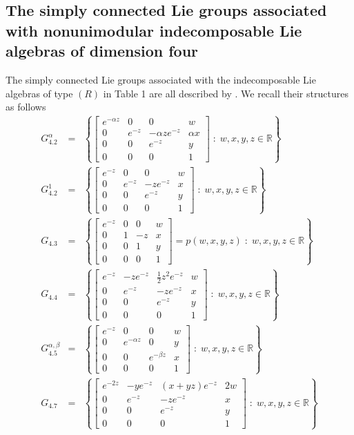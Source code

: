 \documentclass[12pt,a4paper,twoside]{article}
\theoremstyle{definition}
\begin{document}
\subsection{The simply connected Lie groups associated with nonunimodular indecomposable Lie algebras of dimension four}
The simply connected Lie groups associated with the indecomposable Lie algebras of type $(R)$ in Table 1 are all described by \cite{biggs2016classification}. We recall their structures as follows
\begin{eqnarray*}
G_{4.2}^{\alpha} &=& \left\lbrace \begin{bmatrix}
e^{-\alpha z} & 0 & 0 & w\\
0 & e^{-z} & -\alpha ze^{-z} & \alpha x\\
0 & 0 & e^{-z} & y\\
0 & 0 & 0 & 1
\end{bmatrix} \;:\; w, x, y, z \in \mathbb{R}\right\rbrace\\
G_{4.2}^{1} &=& \left\lbrace \begin{bmatrix}
e^{-z} & 0 & 0 & w\\
0 & e^{-z} & -ze^{-z} & x\\
0 & 0 & e^{-z} & y\\
0 & 0 & 0 & 1
\end{bmatrix} \;:\; w, x, y, z \in \mathbb{R}\right\rbrace\\
G_{4.3} &=& \left\lbrace \begin{bmatrix}
e^{-z} & 0 & 0 & w\\
0 & 1 & -z & x\\
0 & 0 & 1 & y\\
0 & 0 & 0 & 1
\end{bmatrix} = p(w, x, y, z) \;:\; w, x, y, z \in \mathbb{R}\right\rbrace\\
G_{4.4} &=& \left\lbrace \begin{bmatrix}
e^{-z} & -ze^{-z} & \frac{1}{2}z^2e^{-z} & w\\
0 & e^{-z} & -ze^{-z} & x\\
0 & 0 & e^{-z} & y\\
0 & 0 & 0 & 1
\end{bmatrix} \;:\; w, x, y, z \in \mathbb{R}\right\rbrace\\
G_{4.5}^{\alpha, \beta} &=& \left\lbrace \begin{bmatrix}
e^{-z} & 0 & 0 & w\\
0 & e^{-\alpha z} & 0 & y\\
0 & 0 & e^{-\beta z} & x\\
0 & 0 & 0 & 1
\end{bmatrix} \;:\; w, x, y, z \in \mathbb{R}\right\rbrace\\
G_{4.7} &=& \left\lbrace \begin{bmatrix}
e^{-2z} & -ye^{-z} & (x + yz)e^{-z} & 2w\\
0 & e^{-z} & -ze^{-z} & x\\
0 & 0 & e^{-z} & y\\
0 & 0 & 0 & 1
\end{bmatrix} \;:\; w, x, y, z \in \mathbb{R}\right\rbrace
\end{eqnarray*}
\end{document}
